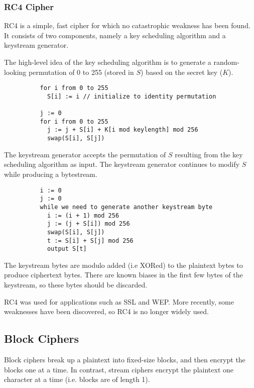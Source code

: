 \documentclass[12pt,titlepage]{article}
\begin{document}
      \subsubsection{RC4 Cipher}
        RC4 is a simple, fast cipher for which no catastrophic weakness has been found. It consists of two components, namely a key scheduling algorithm
        and a keystream generator.

        The high-level idea of the key scheduling algorithm is to generate a random-looking permutation of 0 to 255 (stored in $S$) based on the secret
        key ($K$).

        \begin{verbatim}
          for i from 0 to 255
            S[i] := i // initialize to identity permutation

          j := 0
          for i from 0 to 255
            j := j + S[i] + K[i mod keylength] mod 256
            swap(S[i], S[j])
        \end{verbatim}

        The keystream generator accepts the permutation of $S$ resulting from the key scheduling algorithm as input. The keystream generator continues to
        modify $S$ while producing a bytestream.

        \begin{verbatim}
          i := 0
          j := 0
          while we need to generate another keystream byte
            i := (i + 1) mod 256
            j := (j + S[i]) mod 256
            swap(S[i], S[j])
            t := S[i] + S[j] mod 256
            output S[t]
        \end{verbatim}

        The keystream bytes are modulo added (i.e XORed) to the plaintext bytes to produce ciphertext bytes. There are known biases in the first few bytes
        of the keystream, so these bytes should be discarded.

        RC4 was used for applications such as SSL and WEP. More recently, some weaknesses have been discovered, so RC4 is no longer widely used.

    \subsection{Block Ciphers}
      Block ciphers break up a plaintext into fixed-size blocks, and then encrypt the blocks one at a time. In contrast, stream ciphers encrypt the plaintext
      one character at a time (i.e. blocks are of length 1).
\end{document}
